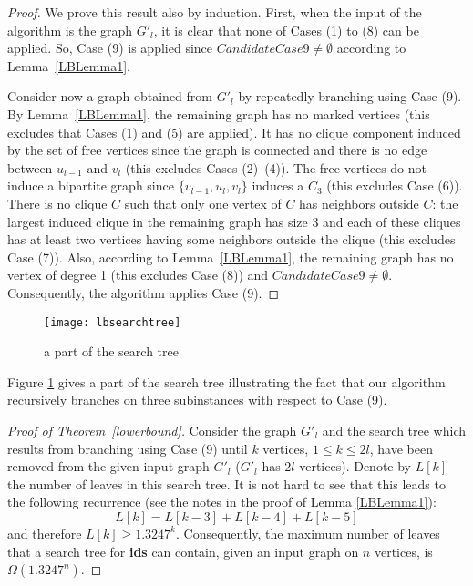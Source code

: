 \documentclass[a4paper,10pt]{article}
\theoremstyle{plain}
\theoremstyle{definition}
\theoremstyle{remark}
\begin{document}
\begin{proof}
We prove this result also by induction.
First, when the input of the algorithm is the graph $G'_l$,
it is clear that none of Cases (1) to (8) can be applied.
So, Case (9) is applied since $CandidateCase9\not = \emptyset$ according
to Lemma~\ref{LBLemma1}.

Consider now a graph obtained from $G'_l$ by repeatedly
branching using Case (9).
By Lemma~\ref{LBLemma1}, the remaining graph
has no marked vertices (this excludes that
Cases (1) and (5) are applied). It has no clique component induced by the set of free vertices
since the graph is connected and there is no edge between
$u_{l-1}$ and $v_l$ (this excludes Cases (2)--(4)). The free vertices do not induce a bipartite graph
since $\{ v_{l-1}, u_l, v_l\}$ induces a $C_3$ (this excludes Case (6)). There is no clique $C$
such that only one vertex of $C$ has neighbors outside $C$: the largest induced clique in the remaining
graph has size 3 and each of these cliques has at least two vertices having some neighbors outside
the clique (this excludes Case (7)). Also, according to Lemma~\ref{LBLemma1}, the remaining graph
has no vertex of degree 1 (this excludes Case (8)) and $CandidateCase9\not = \emptyset$.
Consequently, the algorithm applies Case (9).
\end{proof}

\begin{figure}[htb]
\centering
      \texttt{[image: lbsearchtree]}
      \caption{\label{lbsearchtree}a part of the search tree}
\end{figure}


Figure \ref{lbsearchtree} gives a part of the search tree illustrating the fact that
our algorithm recursively branches on three subinstances with respect to Case (9).

\begin{proof}[Proof of Theorem~\ref{lowerbound}]
Consider the graph $G'_l$ and the search tree which results from branching using
Case (9) until $k$ vertices, $1\leq k \leq 2l$, have been removed from the
given input graph $G'_l$ ($G'_l$ has $2l$ vertices).
Denote by $L[k]$ the number of leaves in this search tree.
It is not hard to see that this leads to the following recurrence
(see the notes in the proof of Lemma \ref{LBLemma1}):
$$L[k] = L[k-3] + L[k-4] + L[k-5]$$ and therefore $L[k] \geq 1.3247^{k}$.
Consequently, the maximum number of leaves that
a search tree for {\bf ids} can contain, given an input graph on $n$
vertices, is $\Omega(1.3247^n)$.
\end{proof}
\end{document}
